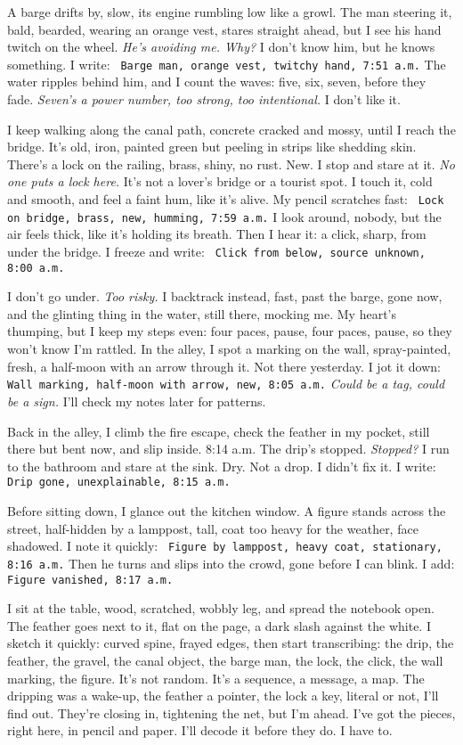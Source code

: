 \documentclass[12pt]{article} %
\newcommand{\note}[1]{\texttt{\small \color{DarkGray} #1}}
\begin{document}
A barge drifts by, slow, its engine rumbling low like a growl. The man steering it, bald, bearded, wearing an orange vest, stares straight ahead, but I see his hand twitch on the wheel. \textit{He’s avoiding me. Why?} I don’t know him, but he knows something. I write: \note{Barge man, orange vest, twitchy hand, 7:51 a.m.} The water ripples behind him, and I count the waves: five, six, seven, before they fade. \textit{Seven’s a power number, too strong, too intentional.} I don’t like it.

I keep walking along the canal path, concrete cracked and mossy, until I reach the bridge. It’s old, iron, painted green but peeling in strips like shedding skin. There’s a lock on the railing, brass, shiny, no rust. New. I stop and stare at it. \textit{No one puts a lock here.} It’s not a lover’s bridge or a tourist spot. I touch it, cold and smooth, and feel a faint hum, like it’s alive. My pencil scratches fast: \note{Lock on bridge, brass, new, humming, 7:59 a.m.} I look around, nobody, but the air feels thick, like it’s holding its breath. Then I hear it: a click, sharp, from under the bridge. I freeze and write: \note{Click from below, source unknown, 8:00 a.m.}

I don’t go under. \textit{Too risky.} I backtrack instead, fast, past the barge, gone now, and the glinting thing in the water, still there, mocking me. My heart’s thumping, but I keep my steps even: four paces, pause, four paces, pause, so they won’t know I’m rattled. In the alley, I spot a marking on the wall, spray-painted, fresh, a half-moon with an arrow through it. Not there yesterday. I jot it down: \note{Wall marking, half-moon with arrow, new, 8:05 a.m.} \textit{Could be a tag, could be a sign.} I’ll check my notes later for patterns.

Back in the alley, I climb the fire escape, check the feather in my pocket, still there but bent now, and slip inside. 8:14 a.m. The drip’s stopped. \textit{Stopped?} I run to the bathroom and stare at the sink. Dry. Not a drop. I didn’t fix it. I write: \note{Drip gone, unexplainable, 8:15 a.m.}

Before sitting down, I glance out the kitchen window. A figure stands across the street, half-hidden by a lamppost, tall, coat too heavy for the weather, face shadowed. I note it quickly: \note{Figure by lamppost, heavy coat, stationary, 8:16 a.m.} Then he turns and slips into the crowd, gone before I can blink. I add: \note{Figure vanished, 8:17 a.m.}

I sit at the table, wood, scratched, wobbly leg, and spread the notebook open. The feather goes next to it, flat on the page, a dark slash against the white. I sketch it quickly: curved spine, frayed edges, then start transcribing: the drip, the feather, the gravel, the canal object, the barge man, the lock, the click, the wall marking, the figure. It’s not random. It’s a sequence, a message, a map. The dripping was a wake-up, the feather a pointer, the lock a key, literal or not, I’ll find out. They’re closing in, tightening the net, but I’m ahead. I’ve got the pieces, right here, in pencil and paper. I’ll decode it before they do. I have to.
\end{document}
